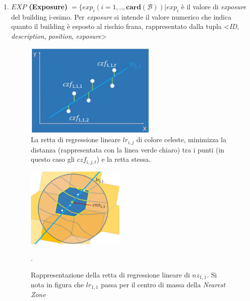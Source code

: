 \begin{enumerate}
	\item \label{last_enum} \textbf{$EXP$ (Exposure)} $ = \{exp_i(i=1,..,\mathbf{card}(\mathcal{B})) | exp_i $ è il valore di \textit{exposure} del building i-esimo. Per \textit{exposure} si intende il valore numerico che indica quanto il building è esposto al rischio frana, 
	rappresentato dalla tupla <\textit{ID}, \textit{description}, \textit{position}, \textit{exposure}> 
	
			\begin{figure}[h]
		\centering
		\includegraphics[width=0.6\textwidth]{images/linear_regression1}
		\caption{La retta di regressione lineare $lr_{i,j}$ di colore celeste, minimizza la distanza (rappresentata con la linea verde chiaro) tra i punti (in questo caso gli $czf_{i,j,t}$) e la retta stessa.}
		\label{linear_regression1}
	\end{figure}
	\newpage
	\begin{figure}[t!]
		\centering
		\includegraphics[width=0.45\textwidth]{images/linear_regression2}
		\caption{Rappresentazione della retta di regressione lineare di $nz_{1,1}$. Si nota in figura che $lr_{1,1}$ passa per il centro di massa della \textit{Nearest Zone}}.
		\label{linear_regression}
	\end{figure}
	
\end{enumerate}
